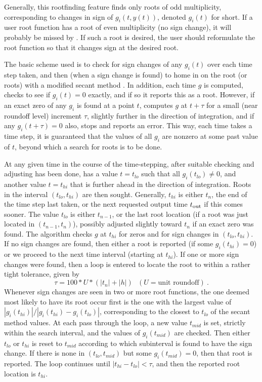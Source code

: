 Generally, this rootfinding feature finds only roots of odd
multiplicity, corresponding to changes in sign of $g_i(t,y(t))$,
denoted $g_i(t)$ for short.  If a user root function has a root of
even multiplicity (no sign change), it will probably be missed by
{\cvode}.  If such a root is desired, the user should reformulate the
root function so that it changes sign at the desired root.

The basic scheme used is to check for sign changes of any $g_i(t)$ over
each time step taken, and then (when a sign change is found) to home
in on the root (or roots) with a modified secant method \cite{HeSh:80}.  
In addition, each time $g$ is computed, {\cvode} checks to see if 
$g_i(t) = 0$ exactly, and if so it reports this as a root.  However,
if an exact zero of any $g_i$ is found at a point $t$, {\cvode}
computes $g$ at $t + \tau$ for a small (near roundoff level) increment
$\tau$, slightly further in the direction of integration, and if any
$g_i(t + \tau) = 0$ also, {\cvode} stops and reports an error.  This
way, each time {\cvode} takes a time step, it is guaranteed that the
values of all $g_i$ are nonzero at some past value of $t$, beyond
which a search for roots is to be done.

At any given time in the course of the time-stepping, after suitable
checking and adjusting has been done, {\cvode} has a value 
$t = t_{lo}$ such that all $g_i(t_{lo}) \neq 0$, and another value
$t = t_{hi}$ that is further ahead in the direction of integration.
Roots in the interval $(t_{lo},t_{hi})$ are then sought.  Generally,
$t_{hi}$ is either $t_n$, the end of the time step last taken, or
the next requested output time $t_{\mbox{\scriptsize out}}$ if this
comes sooner.  The value $t_{lo}$ is either $t_{n-1}$, or the last
root location (if a root was just located in $(t_{n-1},t_n)$),
possibly adjusted slightly toward $t_n$ if an exact zero was found.
The algorithm checks $g$ at $t_{hi}$ for zeros and for sign changes in
$(t_{lo},t_{hi})$.  If no sign changes are found, then either a root
is reported (if some $g_i(t_{hi}) = 0$) or we proceed to the next time
interval (starting at $t_{hi}$).  If one or more sign changes were
found, then a loop is entered to locate the root to within a rather
tight tolerance, given by
\[ \tau = 100 * U * (|t_n| + |h|)~~~ (U = \mbox{unit roundoff}) ~. \]
Whenever sign changes are seen in two or more root functions, the one
deemed most likely to have its root occur first is the one with the
largest value of $|g_i(t_{hi})|/|g_i(t_{hi}) - g_i(t_{lo})|$,
corresponding to the closest to $t_{lo}$ of the secant method values.
At each pass through the loop, a new value $t_{mid}$ is set, strictly
within the search interval, and the values of $g_i(t_{mid})$ are
checked.  Then either $t_{lo}$ or $t_{hi}$ is reset to $t_{mid}$
according to which subinterval is found to have the sign change.  If
there is none in $(t_{lo},t_{mid})$ but some $g_i(t_{mid}) = 0$, then
that root is reported.  The loop continues until 
$|t_{hi}-t_{lo}| < \tau$, and then the reported root location is
$t_{hi}$.

